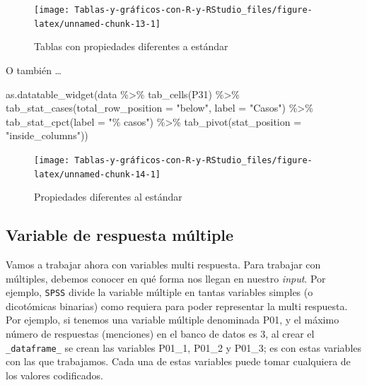 \documentclass[
]{book}
\newenvironment{Shaded}{\begin{snugshade}}{\end{snugshade}}
\newcommand{\AttributeTok}[1]{\textcolor[rgb]{0.77,0.63,0.00}{#1}}
\newcommand{\FunctionTok}[1]{\textcolor[rgb]{0.00,0.00,0.00}{#1}}
\newcommand{\NormalTok}[1]{#1}
\newcommand{\SpecialCharTok}[1]{\textcolor[rgb]{0.00,0.00,0.00}{#1}}
\newcommand{\StringTok}[1]{\textcolor[rgb]{0.31,0.60,0.02}{#1}}
\begin{document}
\begin{figure}[H]

{\centering \texttt{[image: Tablas-y-gráficos-con-R-y-RStudio\_files/figure-latex/unnamed-chunk-13-1]} 

}

\caption{Tablas con propiedades diferentes a estándar}\label{fig:unnamed-chunk-13}
\end{figure}

O también \ldots{}

\begin{Shaded}
\begin{Highlighting}[]
\FunctionTok{as.datatable\_widget}\NormalTok{(data }\SpecialCharTok{\%\textgreater{}\%} \FunctionTok{tab\_cells}\NormalTok{(P31) }\SpecialCharTok{\%\textgreater{}\%} \FunctionTok{tab\_stat\_cases}\NormalTok{(}\AttributeTok{total\_row\_position =} \StringTok{"below"}\NormalTok{, }
  \AttributeTok{label =} \StringTok{"Casos"}\NormalTok{) }\SpecialCharTok{\%\textgreater{}\%} \FunctionTok{tab\_stat\_cpct}\NormalTok{(}\AttributeTok{label =} \StringTok{"\% casos"}\NormalTok{) }\SpecialCharTok{\%\textgreater{}\%} 
  \FunctionTok{tab\_pivot}\NormalTok{(}\AttributeTok{stat\_position =} \StringTok{"inside\_columns"}\NormalTok{))}
\end{Highlighting}
\end{Shaded}

\begin{figure}[H]

{\centering \texttt{[image: Tablas-y-gráficos-con-R-y-RStudio\_files/figure-latex/unnamed-chunk-14-1]} 

}

\caption{Propiedades diferentes al estándar}\label{fig:unnamed-chunk-14}
\end{figure}

\hypertarget{variable-de-respuesta-muxfaltiple}{%
\subsection{Variable de respuesta múltiple}\label{variable-de-respuesta-muxfaltiple}}

Vamos a trabajar ahora con variables multi respuesta. Para trabajar con múltiples, debemos conocer en qué forma nos llegan en nuestro \emph{input}. Por ejemplo, \texttt{SPSS} divide la variable múltiple en tantas variables simples (o dicotómicas binarias) como requiera para poder representar la multi respuesta. Por ejemplo, si tenemos una variable múltiple denominada P01, y el máximo número de respuestas (menciones) en el banco de datos es 3, al crear el \texttt{\_dataframe\_} se crean las variables P01\_1, P01\_2 y P01\_3; es con estas variables con las que trabajamos. Cada una de estas variables puede tomar cualquiera de los valores codificados.
\end{document}
